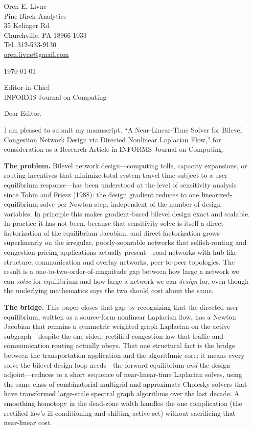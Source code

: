 \documentclass[10pt]{article}
\begin{document}
Oren E. Livne\\
Pine Birch Analytics\\
35 Kelinger Rd\\
Churchville, PA 18966-1033\\
Tel. 312-533-9130\\
\href{mailto:oren.livne@gmail.com}{oren.livne@gmail.com}

\vspace{0.3em}
\today

\vspace{0.3em}
Editor-in-Chief\\
INFORMS Journal on Computing

\vspace{0.3em}
Dear Editor,

I am pleased to submit my manuscript, ``A Near-Linear-Time Solver for Bilevel Congestion Network Design via
Directed Nonlinear Laplacian Flow,'' for consideration as a Research Article in INFORMS Journal on Computing.

\textbf{The problem.} Bilevel network design---computing tolls, capacity expansions, or routing incentives
that minimize total system travel time subject to a user-equilibrium response---has been understood at the
level of sensitivity analysis since Tobin and Friesz (1988): the design gradient reduces to one
linearized-equilibrium solve per Newton step, independent of the number of design variables. In principle this
makes gradient-based bilevel design exact and scalable. In practice it has not been, because that sensitivity
solve is itself a direct factorization of the equilibrium Jacobian, and direct factorization grows
superlinearly on the irregular, poorly-separable networks that selfish-routing and congestion-pricing
applications actually present---road networks with hub-like structure, communication and overlay networks,
peer-to-peer topologies. The result is a one-to-two-order-of-magnitude gap between how large a network we can
\emph{solve} for equilibrium and how large a network we can \emph{design} for, even though the underlying
mathematics says the two should cost about the same.

\textbf{The bridge.} This paper closes that gap by recognizing that the directed user equilibrium, written as a
source-form nonlinear Laplacian flow, has a Newton Jacobian that remains a symmetric weighted graph Laplacian
on the active subgraph---despite the one-sided, rectified congestion law that traffic and communication
routing actually obeys. That one structural fact is the bridge between the transportation application and the
algorithmic core: it means every solve the bilevel design loop needs---the forward equilibrium \emph{and} the
design adjoint---reduces to a short sequence of near-linear-time Laplacian solves, using the same class of
combinatorial multigrid and approximate-Cholesky solvers that have transformed large-scale spectral graph
algorithms over the last decade. A smoothing homotopy in the dead-zone width handles the one complication (the
rectified law's ill-conditioning and shifting active set) without sacrificing that near-linear cost.
\end{document}
